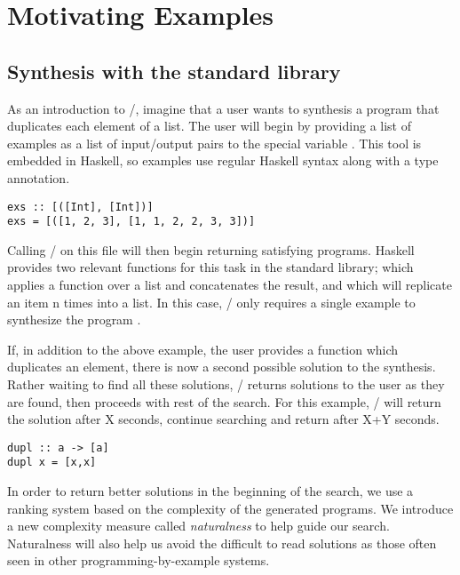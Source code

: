 \section{Motivating Examples} 
\label{examples}

\subsection{Synthesis with the standard library}

As an introduction to \ourTool/, imagine that a user wants to synthesis a  program that duplicates each element of a list. 
The user will begin by providing a list of examples as a list of input/output pairs to the special variable .
This tool is embedded in Haskell, so examples use regular Haskell syntax along with a type annotation.

\begin{lstlisting}
exs :: [([Int], [Int])]
exs = [([1, 2, 3], [1, 1, 2, 2, 3, 3])]
\end{lstlisting}

Calling \ourTool/ on this file will then begin returning satisfying programs.
Haskell provides two relevant functions for this task in the standard library;  which applies a function over a list and concatenates the result, and  which will replicate an item n times into a list.
In this case, \ourTool/ only requires a single example to synthesize the program .

If, in addition to the above example, the user provides a function  which duplicates an element, there is now a second possible solution to the synthesis.
Rather waiting to find all these solutions, \ourTool/ returns solutions to the user as they are found, then proceeds with rest of the search.
For this example, \ourTool/ will return the solution  after X seconds, continue searching and return  after X+Y seconds.

\begin{lstlisting}
dupl :: a -> [a]
dupl x = [x,x]
\end{lstlisting}

In order to return better solutions in the beginning of the search, we use a ranking system based on the complexity of the generated programs.
We introduce a new complexity measure called \textit{naturalness} to help guide our search.
Naturalness will also help us avoid the difficult to read solutions as those often seen in other programming-by-example systems.

